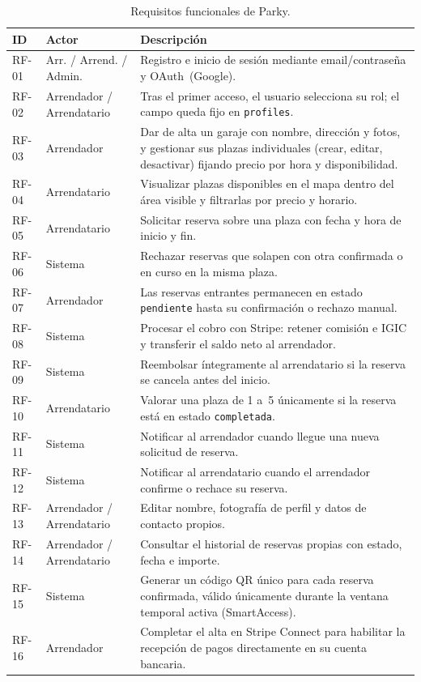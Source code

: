 \begin{table}[htbp]
\centering
\caption{Requisitos funcionales de Parky.}
\label{tab:rf}
\begin{tabularx}{\textwidth}{llX}
\toprule
\textbf{ID} & \textbf{Actor} & \textbf{Descripción} \\
\midrule
\rowcolor{gray!5}
RF-01 & Arr. / Arrend. / Admin. & Registro e inicio de sesión mediante email/contraseña y OAuth~(Google). \\
RF-02 & Arrendador / Arrendatario & Tras el primer acceso, el usuario selecciona su rol; el campo queda fijo en \texttt{profiles}. \\
\rowcolor{gray!5}
RF-03 & Arrendador   & Dar de alta un garaje con nombre, dirección y fotos, y gestionar sus plazas individuales (crear, editar, desactivar) fijando precio por hora y disponibilidad. \\
RF-04 & Arrendatario & Visualizar plazas disponibles en el mapa dentro del área visible y filtrarlas por precio y horario. \\
\rowcolor{gray!5}
RF-05 & Arrendatario & Solicitar reserva sobre una plaza con fecha y hora de inicio y fin. \\
RF-06 & Sistema      & Rechazar reservas que solapen con otra confirmada o en curso en la misma plaza. \\
\rowcolor{gray!5}
RF-07 & Arrendador   & Las reservas entrantes permanecen en estado \texttt{pendiente} hasta su confirmación o rechazo manual. \\
RF-08 & Sistema      & Procesar el cobro con Stripe: retener comisión e IGIC y transferir el saldo neto al arrendador. \\
\rowcolor{gray!5}
RF-09 & Sistema      & Reembolsar íntegramente al arrendatario si la reserva se cancela antes del inicio. \\
RF-10 & Arrendatario & Valorar una plaza de 1 a~5 únicamente si la reserva está en estado \texttt{completada}. \\
\rowcolor{gray!5}
RF-11 & Sistema      & Notificar al arrendador cuando llegue una nueva solicitud de reserva. \\
RF-12 & Sistema      & Notificar al arrendatario cuando el arrendador confirme o rechace su reserva. \\
\rowcolor{gray!5}
RF-13 & Arrendador / Arrendatario & Editar nombre, fotografía de perfil y datos de contacto propios. \\
RF-14 & Arrendador / Arrendatario & Consultar el historial de reservas propias con estado, fecha e importe. \\
\rowcolor{gray!5}
RF-15 & Sistema      & Generar un código QR único para cada reserva confirmada, válido únicamente durante la ventana temporal activa (SmartAccess). \\
RF-16 & Arrendador   & Completar el alta en Stripe Connect para habilitar la recepción de pagos directamente en su cuenta bancaria. \\
\bottomrule
\end{tabularx}
\end{table}

